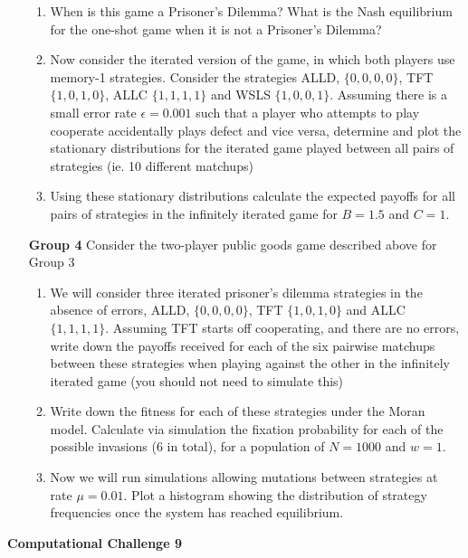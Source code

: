 \documentclass[12pt]{article}
\begin{document}
\begin{enumerate}
\begin{enumerate}
\item When is this game a Prisoner's Dilemma? What is the Nash equilibrium for the one-shot game when it is not a Prisoner's Dilemma?
\item Now consider the iterated version of the game, in which both players use memory-1 strategies. Consider the strategies ALLD, $\{0,0,0,0\}$, TFT $\{1,0,1,0\}$, ALLC $\{1,1,1,1\}$ and WSLS $\{1,0,0,1\}$. Assuming there is a small error rate $\epsilon=0.001$ such that a player who attempts to play cooperate accidentally plays defect and vice versa, determine and plot the stationary distributions for the iterated game played between all pairs of strategies (ie. 10 different matchups) 
\item Using these stationary distributions calculate the expected payoffs for all pairs of strategies in the infinitely iterated game for $B=1.5$ and $C=1$.
\end{enumerate}

\item[\bf Group 4] 
Consider the two-player public goods game described above for Group 3


\begin{enumerate}
\item We will consider three iterated prisoner's dilemma strategies in the absence of errors, ALLD, $\{0,0,0,0\}$, TFT $\{1,0,1,0\}$ and ALLC $\{1,1,1,1\}$. Assuming TFT starts off cooperating, and there are no errors, write down the payoffs received for each of the six pairwise matchups between these strategies when playing against the other in the infinitely iterated game (you should not need to simulate this)
\item Write down the fitness for each of these strategies under the Moran model. Calculate via simulation the fixation probability for each of the possible invasions (6 in total), for a population of $N=1000$ and $w=1$.
\item Now we will run simulations allowing mutations between strategies at rate $\mu=0.01$. Plot a histogram showing the distribution of strategy frequencies once the system has reached equilibrium.
\end{enumerate}

\end{enumerate}


\begin{center}
{\Large \bf Computational Challenge 9
\\ \vskip5mm  }
\end{center}
\end{document}

